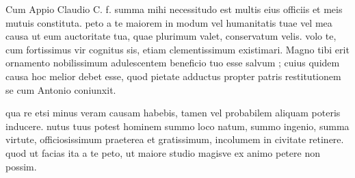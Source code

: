 


 Cum Appio Claudio C. f. summa mihi necessitudo est multis eius officiis et meis mutuis constituta. peto a te maiorem in modum vel humanitatis tuae vel mea causa ut eum auctoritate tua, quae plurimum valet, conservatum velis. volo te, cum fortissimus vir cognitus sis, etiam clementissimum existimari. Magno tibi erit ornamento nobilissimum adulescentem beneficio tuo esse salvum ; cuius quidem causa hoc melior debet esse, quod pietate adductus propter patris restitutionem se cum Antonio coniunxit.

 qua re etsi minus veram causam habebis, tamen vel probabilem aliquam poteris inducere. nutus tuus potest hominem summo loco natum, summo ingenio, summa virtute, officiosissimum praeterea et gratissimum, incolumem in civitate retinere. quod ut facias ita a te peto, ut maiore studio magisve ex animo petere non possim.
